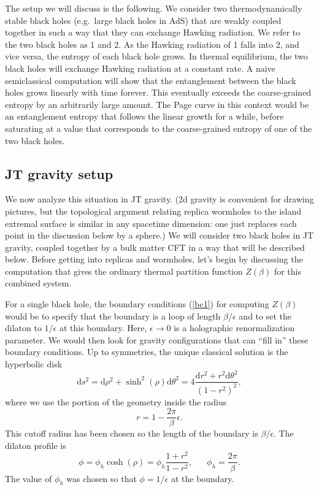 \documentclass[11pt]{article}
\newcommand{\be}{\begin{equation}}
\newcommand{\ee}{\end{equation}}
\numberwithin{equation}{section}
\begin{document}
The setup we will discuss is the following. We consider two thermodynamically stable black holes (e.g.~large black holes in AdS) that are weakly coupled together in such a way that they can exchange Hawking radiation. We refer to the two black holes as 1 and 2. As the Hawking radiation of 1 falls into 2, and vice versa, the entropy of each black hole grows. In thermal equilibrium, the two black holes will exchange Hawking radiation at a constant rate. A naive semiclassical computation will show that the entanglement between the black holes grows linearly with time forever. This eventually exceeds the coarse-grained entropy by an arbitrarily large amount. The Page curve in this context would be an entanglement entropy that follows the linear growth for a while, before saturating at a value that corresponds to the coarse-grained entropy of one of the two black holes.

\subsection{JT gravity setup}
We now analyze this situation in JT gravity. (2d gravity is convenient for drawing pictures, but the topological argument relating replica wormholes to the island extremal surface is similar in any spacetime dimension: one just replaces each point in the discussion below by a sphere.) We will consider two black holes in JT gravity, coupled together by a bulk matter CFT in a way that will be described below. Before getting into replicas and wormholes, let's begin by discussing the computation that gives the ordinary thermal partition function $Z(\beta)$ for this combined system.

For a single black hole, the boundary conditions (\ref{bc1}) for computing $Z(\beta)$ would be to specify that the boundary is a loop of length $\beta/\epsilon$ and to set the dilaton to $1/\epsilon$ at this boundary. Here, $\epsilon \rightarrow 0$ is a holographic renormalization parameter. We would then look for gravity configurations that can ``fill in'' these boundary conditions. Up to symmetries, the unique classical solution is the hyperbolic disk
\be
\mathrm{d}s^2 = \mathrm{d}\rho^2 + \sinh^2(\rho)\mathrm{d}\theta^2 = 4\frac{\mathrm{d}r^2 + r^2\mathrm{d}\theta^2}{(1-r^2)^2},\label{rotinv}
\ee
where we use the portion of the geometry inside the radius
\be
r = 1 - \frac{2\pi}{\beta}\epsilon.
\ee
This cutoff radius has been chosen so the length of the boundary is $\beta / \epsilon$. The  dilaton profile is
\be
\phi = \phi_h \cosh(\rho) = \phi_h \frac{1+r^2}{1-r^2}, \hspace{20pt} \phi_h = \frac{2\pi}{\beta}.
\ee
The value of $\phi_h$ was chosen so that $\phi = 1/\epsilon$ at the boundary.
\end{document}
